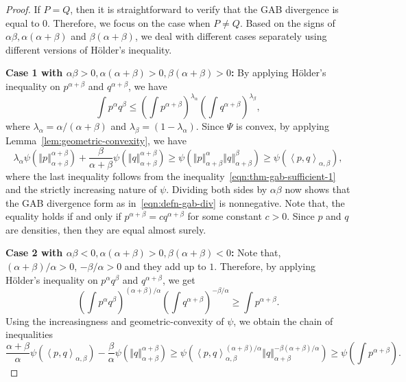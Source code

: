\documentclass[10pt,a4paper]{amsart}
\newcommand{\inner}[1]{\left\langle #1\right\rangle}
\newcommand{\norm}[1]{\left\Vert #1 \right\Vert}
\begin{document}
\begin{proof}
    If $P = Q$, then it is straightforward to verify that the GAB divergence is equal to $0$. Therefore, we focus on the case when $P \neq Q$. Based on the signs of $\alpha\beta,\alpha(\alpha+\beta)$ and $\beta(\alpha+\beta)$, we deal with different cases separately using different versions of H\"{o}lder's inequality.

    \noindent\textbf{Case 1 with $\alpha\beta > 0, \alpha(\alpha+\beta) > 0, \beta(\alpha+\beta) > 0$:} By applying H\"{o}lder's inequality on $p^{\alpha+\beta}$ and $q^{\alpha+\beta}$, we have
    \begin{equation}
        \int p^\alpha q^\beta \leq \left( \int p^{\alpha+\beta} \right)^{\lambda_\alpha} \left( \int q^{\alpha+\beta} \right)^{\lambda_\beta},
        \label{eqn:thm-gab-sufficient-1}
    \end{equation}
    \noindent where $\lambda_\alpha = \alpha/(\alpha+\beta)$ and $\lambda_\beta = (1 - \lambda_\alpha)$. Since $\Psi$ is convex, by applying Lemma~\ref{lem:geometric-convexity}, we have
    \begin{equation*}
        \lambda_\alpha \psi\left( \norm{p}_{\alpha+\beta}^{\alpha+\beta}\right) + \frac{\beta}{\alpha+\beta} \psi\left( \norm{q}_{\alpha+\beta}^{\alpha+\beta}\right)
        \geq  \psi\left( \norm{p}_{\alpha+\beta}^\alpha \norm{q}_{\alpha+\beta}^\beta \right)
        \geq \psi\left( \inner{p,q}_{\alpha,\beta} \right),
    \end{equation*}
    \noindent where the last inequality follows from the inequality~\eqref{eqn:thm-gab-sufficient-1} and the strictly increasing nature of $\psi$. Dividing both sides by $\alpha\beta$ now shows that the GAB divergence form as in~\eqref{eqn:defn-gab-div} is nonnegative. Note that, the equality holds if and only if $p^{\alpha+\beta} = cq^{\alpha+\beta}$ for some constant $c > 0$. Since $p$ and $q$ are densities, then they are equal almost surely.

    \noindent\textbf{Case 2 with $\alpha\beta < 0, \alpha(\alpha+\beta) > 0, \beta(\alpha+\beta) < 0$:} Note that, $(\alpha + \beta)/\alpha > 0$, $-\beta/\alpha > 0$ and they add up to $1$. Therefore, by applying H\"{o}lder's inequality on $p^{\alpha}q^\beta$ and $q^{\alpha+\beta}$, we get
    \begin{equation*}
        \left( \int p^{\alpha} q^\beta \right)^{(\alpha+\beta)/\alpha} \left( \int q^{\alpha+\beta} \right)^{-\beta/\alpha} \geq \int p^{\alpha+\beta}.
    \end{equation*}
    \noindent Using the increasingness and geometric-convexity of $\psi$, we obtain the chain of inequalities
    \begin{equation*}
        \dfrac{\alpha+\beta}{\alpha} \psi\left( \inner{p,q}_{\alpha,\beta} \right) - \dfrac{\beta}{\alpha} \psi\left( \norm{q}_{\alpha+\beta}^{\alpha+\beta} \right)
        \geq \psi\left( \inner{p, q}_{\alpha,\beta}^{(\alpha+\beta)/\alpha} \norm{q}_{\alpha+\beta}^{-\beta(\alpha+\beta)/\alpha} \right)
        \geq \psi\left( \int p^{\alpha+\beta} \right).
    \end{equation*}


\end{proof}
\end{document}
